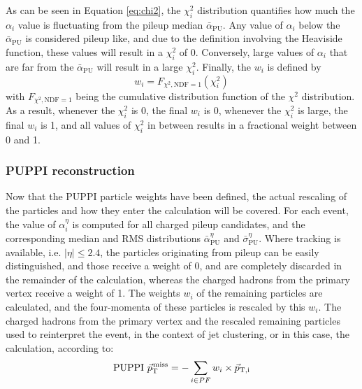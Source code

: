 As can be seen in Equation \ref{eq:chi2}, the $\chi_i^2$ distribution quantifies how much the $\alpha_i$ value is fluctuating from the pileup median $\bar{\alpha}_{\text{PU}}$. 
Any value of $\alpha_i$ below the $\bar{\alpha}_{\text{PU}}$ is considered pileup like, and due to the definition involving the Heaviside function, these values will result in a $\chi_{i}^{2}$ of 0.  
Conversely, large values of $\alpha_i$ that are far from the $\bar{\alpha}_{\text{PU}}$ will result in a large $\chi_{i}^{2}$.
Finally, the $w_{i}$ is defined by
\begin{equation}
w_{i} = F_{\chi^{2}, \mathrm{NDF}=1}(\chi_{i}^{2})
\end{equation} 
with $ F_{\chi^{2}, \mathrm{NDF}=1}$ being the cumulative distribution function of the  $\chi^{2}$ distribution. 
As a result, whenever the $\chi_{i}^{2}$ is 0, the final $w_i$ is 0, whenever the $\chi_{i}^{2}$ is large, the final $w_i$ is 1, and all values of $\chi_{i}^{2}$ in between results in a fractional weight between 0 and 1. 
\subsubsection*{PUPPI \ptmiss reconstruction}
\noindent\justify
Now that the PUPPI particle weights have been defined, the actual rescaling of the particles and how they enter the \ptmiss calculation will be covered. 
For each event, the value of $\alpha_{i}^{\eta}$ is computed for all charged pileup candidates, and the corresponding median and RMS distributions $\bar{\alpha}_{\text{PU}}^{\eta}$ and $\bar{\sigma}_{\text{PU}}^{\eta}$. 
Where tracking is available, i.e. $|\eta|\leq2.4$, the particles originating from pileup can be easily distinguished, and those receive a weight of 0, and are completely discarded in the remainder of the calculation, whereas the charged hadrons from the primary vertex receive a weight of 1. 
The weights $w_i$ of the remaining particles are calculated, and the four-momenta of these particles is rescaled by this $w_i$. 
The charged hadrons from the primary vertex and the rescaled remaining particles used to reinterpret the event, in the context of jet clustering, or in this case, the \ptmiss calculation, according to:
\begin{equation}
\mathrm{PUPPI}\,\, {\vec p}_{\mathrm{T}}^{\kern1pt\text{miss}} =- \sum_{i\in PF} w_i \times \vec{p}_{\mathrm{T, i}}             
\end{equation}   
